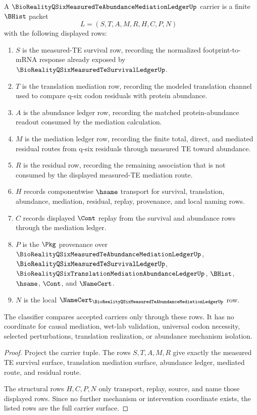 \begin{theorem}
\label{thm:bioreality-q-six-measured-te-abundance-ledger-carrier}
A $\BioRealityQSixMeasuredTeAbundanceMediationLedgerUp$ carrier is a finite $\BHist$ packet
$$
L=(S,T,A,M,R,H,C,P,N)
$$
with the following displayed rows:
\begin{enumerate}
\item $S$ is the measured-TE survival row, recording the normalized footprint-to-mRNA response already exposed by $\BioRealityQSixMeasuredTeSurvivalLedgerUp$.
\item $T$ is the translation mediation row, recording the modeled translation channel used to compare q-six codon residuals with protein abundance.
\item $A$ is the abundance ledger row, recording the matched protein-abundance readout consumed by the mediation calculation.
\item $M$ is the mediation ledger row, recording the finite total, direct, and mediated residual routes from q-six residuals through measured TE toward abundance.
\item $R$ is the residual row, recording the remaining association that is not consumed by the displayed measured-TE mediation route.
\item $H$ records componentwise $\hsame$ transport for survival, translation, abundance, mediation, residual, replay, provenance, and local naming rows.
\item $C$ records displayed $\Cont$ replay from the survival and abundance rows through the mediation ledger.
\item $P$ is the $\Pkg$ provenance over $\BioRealityQSixMeasuredTeAbundanceMediationLedgerUp$, $\BioRealityQSixMeasuredTeSurvivalLedgerUp$, $\BioRealityQSixTranslationMediationAbundanceLedgerUp$, $\BHist$, $\hsame$, $\Cont$, and $\NameCert$.
\item $N$ is the local $\NameCert_{\BioRealityQSixMeasuredTeAbundanceMediationLedgerUp}$ row.
\end{enumerate}
The classifier compares accepted carriers only through these rows. It has no coordinate for causal mediation, wet-lab validation, universal codon necessity, selected perturbations, translation realization, or abundance mechanism isolation.
\end{theorem}
\begin{proof}
Project the carrier tuple. The rows $S,T,A,M,R$ give exactly the measured TE survival surface, translation mediation surface, abundance ledger, mediated route, and residual route.

The structural rows $H,C,P,N$ only transport, replay, source, and name those displayed rows. Since no further mechanism or intervention coordinate exists, the listed rows are the full carrier surface.
\end{proof}

